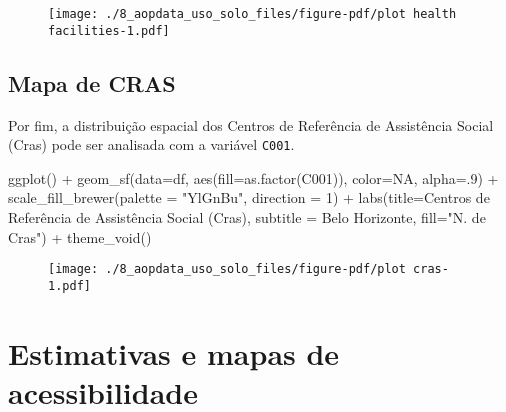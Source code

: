 \documentclass[
  letterpaper,
  DIV=11,
  numbers=noendperiod]{scrreprt}
\newenvironment{Shaded}{\begin{snugshade}}{\end{snugshade}}
\newcommand{\AttributeTok}[1]{\textcolor[rgb]{0.40,0.45,0.13}{#1}}
\newcommand{\ConstantTok}[1]{\textcolor[rgb]{0.56,0.35,0.01}{#1}}
\newcommand{\DecValTok}[1]{\textcolor[rgb]{0.68,0.00,0.00}{#1}}
\newcommand{\FunctionTok}[1]{\textcolor[rgb]{0.28,0.35,0.67}{#1}}
\newcommand{\NormalTok}[1]{\textcolor[rgb]{0.00,0.23,0.31}{#1}}
\newcommand{\SpecialCharTok}[1]{\textcolor[rgb]{0.37,0.37,0.37}{#1}}
\newcommand{\StringTok}[1]{\textcolor[rgb]{0.13,0.47,0.30}{#1}}
\begin{document}
\begin{figure}[H]

{\centering \texttt{[image: ./8\_aopdata\_uso\_solo\_files/figure-pdf/plot health facilities-1.pdf]}

}

\end{figure}

\hypertarget{mapa-de-cras}{%
\section{Mapa de CRAS}\label{mapa-de-cras}}

Por fim, a distribuição espacial dos Centros de Referência de
Assistência Social (Cras) pode ser analisada com a variável
\texttt{C001}.

\begin{Shaded}
\begin{Highlighting}[]
\FunctionTok{ggplot}\NormalTok{() }\SpecialCharTok{+}
  \FunctionTok{geom\_sf}\NormalTok{(}\AttributeTok{data=}\NormalTok{df, }\FunctionTok{aes}\NormalTok{(}\AttributeTok{fill=}\FunctionTok{as.factor}\NormalTok{(C001)), }\AttributeTok{color=}\ConstantTok{NA}\NormalTok{, }\AttributeTok{alpha=}\NormalTok{.}\DecValTok{9}\NormalTok{) }\SpecialCharTok{+}
   \FunctionTok{scale\_fill\_brewer}\NormalTok{(}\AttributeTok{palette =} \StringTok{"YlGnBu"}\NormalTok{, }\AttributeTok{direction =} \DecValTok{1}\NormalTok{) }\SpecialCharTok{+}
  \FunctionTok{labs}\NormalTok{(}\AttributeTok{title=}\StringTok{\textquotesingle{}Centros de Referência de Assistência Social (Cras)\textquotesingle{}}\NormalTok{, }
       \AttributeTok{subtitle =} \StringTok{\textquotesingle{}Belo Horizonte\textquotesingle{}}\NormalTok{, }\AttributeTok{fill=}\StringTok{"N. de Cras"}\NormalTok{) }\SpecialCharTok{+}
  \FunctionTok{theme\_void}\NormalTok{()}
\end{Highlighting}
\end{Shaded}

\begin{figure}[H]

{\centering \texttt{[image: ./8\_aopdata\_uso\_solo\_files/figure-pdf/plot cras-1.pdf]}

}

\end{figure}

\hypertarget{estimativas-e-mapas-de-acessibilidade}{%
\chapter{Estimativas e mapas de
acessibilidade}\label{estimativas-e-mapas-de-acessibilidade}}
\end{document}
